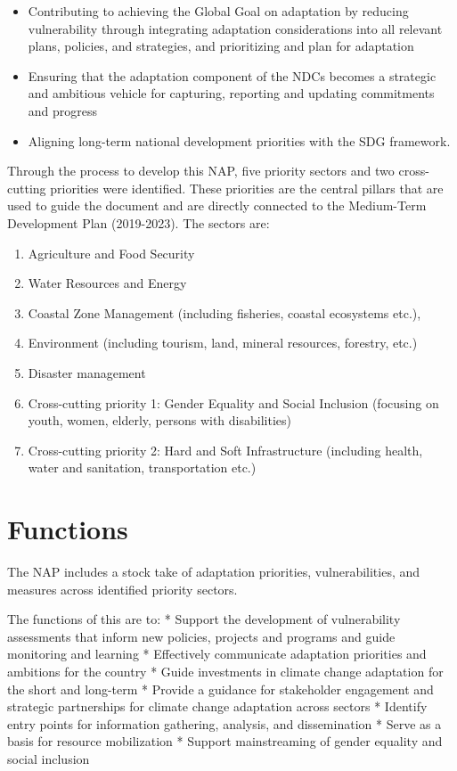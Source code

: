 \documentclass[
]{book}
\providecommand{\tightlist}{%
  \setlength{\itemsep}{0pt}\setlength{\parskip}{0pt}}
\begin{document}
\begin{itemize}
\tightlist
\item
  Contributing to achieving the Global Goal on adaptation by reducing vulnerability through integrating adaptation considerations into all relevant plans, policies, and strategies, and prioritizing and plan for adaptation\\
\item
  Ensuring that the adaptation component of the NDCs becomes a strategic and ambitious vehicle for capturing, reporting and updating commitments and progress
\item
  Aligning long-term national development priorities with the SDG framework.
\end{itemize}

Through the process to develop this NAP, five priority sectors and two cross-cutting priorities were identified. These priorities are the central pillars that are used to guide the document and are directly connected to the Medium-Term Development Plan (2019-2023). The sectors are:

\begin{enumerate}
\def\labelenumi{\arabic{enumi}.}
\tightlist
\item
  Agriculture and Food Security
\item
  Water Resources and Energy
\item
  Coastal Zone Management (including fisheries, coastal ecosystems etc.),
\item
  Environment (including tourism, land, mineral resources, forestry, etc.)
\item
  Disaster management
\item
  Cross-cutting priority 1: Gender Equality and Social Inclusion (focusing on youth, women, elderly, persons with disabilities)
\item
  Cross-cutting priority 2: Hard and Soft Infrastructure (including health, water and sanitation, transportation etc.)
\end{enumerate}

\hypertarget{functions}{%
\section{Functions}\label{functions}}

The NAP includes a stock take of adaptation priorities, vulnerabilities, and measures across identified priority sectors.

The functions of this are to:
* Support the development of vulnerability assessments that inform new policies, projects and programs and guide monitoring and learning
* Effectively communicate adaptation priorities and ambitions for the country
* Guide investments in climate change adaptation for the short and long-term
* Provide a guidance for stakeholder engagement and strategic partnerships for climate change adaptation across sectors
* Identify entry points for information gathering, analysis, and dissemination
* Serve as a basis for resource mobilization
* Support mainstreaming of gender equality and social inclusion
\end{document}
